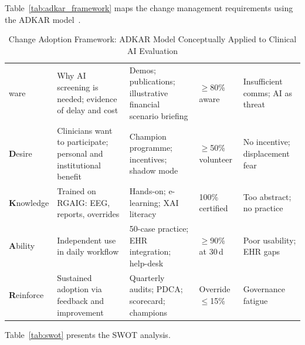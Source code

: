 Table~\ref{tab:adkar_framework} maps the change management requirements using the ADKAR model~\cite{hiatt2006adkar}.

\begin{table}[H]
\tablestripes\tablefontsize
\tablefontsize
\caption[Change Adoption Framework]{Change Adoption Framework: ADKAR Model Conceptually Applied to Clinical AI Evaluation}
\begin{tabularx}{\textwidth}{@{} L L L L L @{}}
\toprule
{} &  &  &  &  \\
\midrule
{}ware & Why AI screening is needed; evidence of delay and cost & Demos; publications; illustrative financial scenario briefing & $\geq$80\% aware & Insufficient comms; AI as threat \\
\addlinespace
\textbf{D}esire & Clinicians want to participate; personal and institutional benefit & Champion programme; incentives; shadow mode & $\geq$50\% volunteer & No incentive; displacement fear \\
\addlinespace
\textbf{K}nowledge & Trained on RGAIG: EEG, reports, overrides & Hands-on; e-learning; XAI literacy & 100\% certified & Too abstract; no practice \\
\addlinespace
\textbf{A}bility & Independent use in daily workflow & 50-case practice; EHR integration; help-desk & $\geq$90\% at 30\,d & Poor usability; EHR gaps \\
\addlinespace
\textbf{R}einforce & Sustained adoption via feedback and improvement & Quarterly audits; PDCA; scorecard; champions & Override$\leq$15\% & Governance fatigue \\
\bottomrule
\end{tabularx}
\end{table}

Table~\ref{tab:swot} presents the SWOT analysis.

